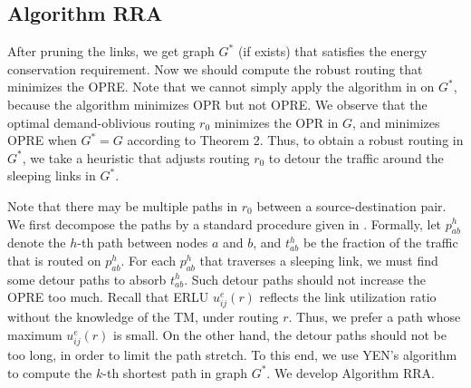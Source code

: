 \documentclass[conference]{IEEEtran}
\begin{document}
\subsection{Algorithm RRA}

After pruning the links, we get graph $G^*$ (if exists) that satisfies the energy conservation requirement. Now we should compute the robust routing that minimizes the OPRE. Note that we cannot simply apply the algorithm in \cite{networking:oblivious} on $G^*$, because the algorithm minimizes OPR but not OPRE. We observe that the optimal demand-oblivious routing $r_0$ minimizes the OPR in $G$, and minimizes OPRE when $G^* = G$ according to Theorem 2. Thus, to obtain a robust routing in $G^*$, we take a heuristic that adjusts routing $r_0$ to detour the traffic around the sleeping links in $G^*$.

Note that there may be multiple paths in $r_0$ between a source-destination pair. We first decompose the paths by a standard procedure given in \cite{}. Formally, let $p^h_{ab}$ denote the $h$-th path between nodes $a$ and $b$, and $t^h_{ab}$ be the fraction of the traffic that is routed on $p^h_{ab}$. For each $p^h_{ab}$ that traverses a sleeping link, we must find some detour paths to absorb $t^h_{ab}$. Such detour paths should not increase the OPRE too much. Recall that ERLU $u^e_{ij}(r)$ reflects the link utilization ratio without the knowledge of the TM, under routing $r$. Thus, we prefer a path whose maximum $u^e_{ij}(r)$ is small. On the other hand, the detour paths should not be too long, in order to limit the path stretch. To this end, we use YEN's algorithm \cite{networking:yens} to compute the $k$-th shortest path in graph $G^*$. We develop Algorithm RRA.
\end{document}
